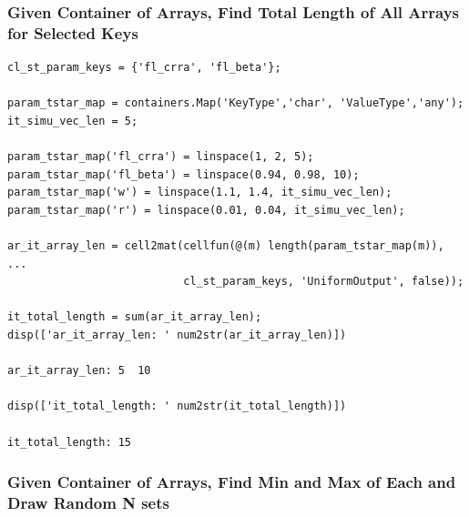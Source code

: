 \documentclass[
]{book}
\begin{document}
\hypertarget{given-container-of-arrays-find-total-length-of-all-arrays-for-selected-keys}{%
\subsubsection{Given Container of Arrays, Find Total Length of All Arrays for Selected Keys}\label{given-container-of-arrays-find-total-length-of-all-arrays-for-selected-keys}}

\begin{verbatim}
cl_st_param_keys = {'fl_crra', 'fl_beta'};

param_tstar_map = containers.Map('KeyType','char', 'ValueType','any');
it_simu_vec_len = 5;

param_tstar_map('fl_crra') = linspace(1, 2, 5);
param_tstar_map('fl_beta') = linspace(0.94, 0.98, 10);
param_tstar_map('w') = linspace(1.1, 1.4, it_simu_vec_len);
param_tstar_map('r') = linspace(0.01, 0.04, it_simu_vec_len);

ar_it_array_len = cell2mat(cellfun(@(m) length(param_tstar_map(m)), ...
                           cl_st_param_keys, 'UniformOutput', false));

it_total_length = sum(ar_it_array_len);
disp(['ar_it_array_len: ' num2str(ar_it_array_len)])

ar_it_array_len: 5  10

disp(['it_total_length: ' num2str(it_total_length)])

it_total_length: 15
\end{verbatim}

\hypertarget{given-container-of-arrays-find-min-and-max-of-each-and-draw-random-n-sets}{%
\subsubsection{Given Container of Arrays, Find Min and Max of Each and Draw Random N sets}\label{given-container-of-arrays-find-min-and-max-of-each-and-draw-random-n-sets}}
\end{document}
